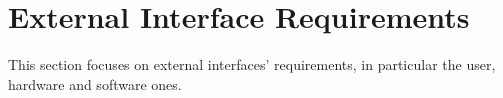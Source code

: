 \section{External Interface Requirements} 

This section focuses on external interfaces' requirements, in particular the user, hardware and software ones.

 
  
 


 
 